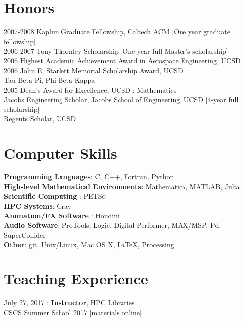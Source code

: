 \documentclass[12pt]{article}
\begin{document}
\section*{Honors}
2007-2008 Kaplun Graduate Fellowship, Caltech ACM [One year graduate fellowship]\\
2006-2007 Tony Thornley Scholarship [One year full Master's scholarship] \\
2006 Highest Academic Achievement Award in Aerospace Engineering, UCSD \\
2006 John E. Starlett Memorial Scholarship Award, UCSD \\
Tau Beta Pi, Phi Beta Kappa \\
2005 Dean's Award for Excellence, UCSD : Mathematics \\
Jacobs Engineering Scholar, Jacobs School of Engineering, UCSD [4-year full scholarship]\\
Regents Scholar, UCSD \\

\section*{Computer Skills}
\textbf{Programming Languages}: C, C++, Fortran, Python \\
\textbf{High-level Mathematical Environments:} Mathematica, MATLAB, Julia\\
\textbf{Scientific Computing} : \textsc{PETSc} \\
\textbf{HPC Systems}: Cray \\
\textbf{Animation/FX Software} : Houdini \\
\textbf{Audio Software}: ProTools, Logic, Digital Performer, MAX/MSP, Pd, SuperCollider\\
\textbf{Other}: git, Unix/Linux, Mac OS X, \LaTeX, Processing

\section*{Teaching Experience}
\label{sec:teaching}

\noindent July 27, 2017 : \textbf{Instructor}, HPC Libraries \\
CSCS Summer School 2017
\href{https://github.com/eth-cscs/SummerSchool2017}{[materials online]}\\
\end{document}
